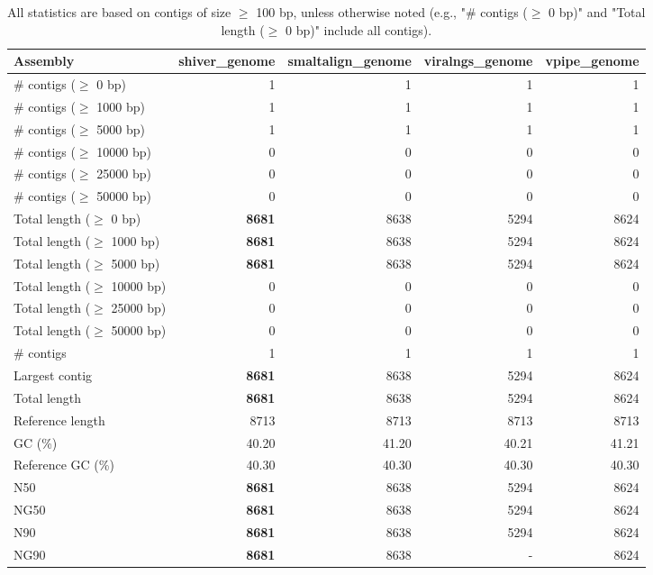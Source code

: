 \documentclass[12pt,a4paper]{article}
\begin{document}
\begin{table}[ht]
\begin{center}
\caption{All statistics are based on contigs of size $\geq$ 100 bp, unless otherwise noted (e.g., "\# contigs ($\geq$ 0 bp)" and "Total length ($\geq$ 0 bp)" include all contigs).}
\begin{tabular}{|l*{4}{|r}|}
\hline
Assembly & shiver\_genome & smaltalign\_genome & viralngs\_genome & vpipe\_genome \\ \hline
\# contigs ($\geq$ 0 bp) & 1 & 1 & 1 & 1 \\ \hline
\# contigs ($\geq$ 1000 bp) & 1 & 1 & 1 & 1 \\ \hline
\# contigs ($\geq$ 5000 bp) & 1 & 1 & 1 & 1 \\ \hline
\# contigs ($\geq$ 10000 bp) & 0 & 0 & 0 & 0 \\ \hline
\# contigs ($\geq$ 25000 bp) & 0 & 0 & 0 & 0 \\ \hline
\# contigs ($\geq$ 50000 bp) & 0 & 0 & 0 & 0 \\ \hline
Total length ($\geq$ 0 bp) & {\bf 8681} & 8638 & 5294 & 8624 \\ \hline
Total length ($\geq$ 1000 bp) & {\bf 8681} & 8638 & 5294 & 8624 \\ \hline
Total length ($\geq$ 5000 bp) & {\bf 8681} & 8638 & 5294 & 8624 \\ \hline
Total length ($\geq$ 10000 bp) & 0 & 0 & 0 & 0 \\ \hline
Total length ($\geq$ 25000 bp) & 0 & 0 & 0 & 0 \\ \hline
Total length ($\geq$ 50000 bp) & 0 & 0 & 0 & 0 \\ \hline
\# contigs & 1 & 1 & 1 & 1 \\ \hline
Largest contig & {\bf 8681} & 8638 & 5294 & 8624 \\ \hline
Total length & {\bf 8681} & 8638 & 5294 & 8624 \\ \hline
Reference length & 8713 & 8713 & 8713 & 8713 \\ \hline
GC (\%) & 40.20 & 41.20 & 40.21 & 41.21 \\ \hline
Reference GC (\%) & 40.30 & 40.30 & 40.30 & 40.30 \\ \hline
N50 & {\bf 8681} & 8638 & 5294 & 8624 \\ \hline
NG50 & {\bf 8681} & 8638 & 5294 & 8624 \\ \hline
N90 & {\bf 8681} & 8638 & 5294 & 8624 \\ \hline
NG90 & {\bf 8681} & 8638 & - & 8624 \\ \hline

\end{tabular}
\end{center}
\end{table}
\end{document}
